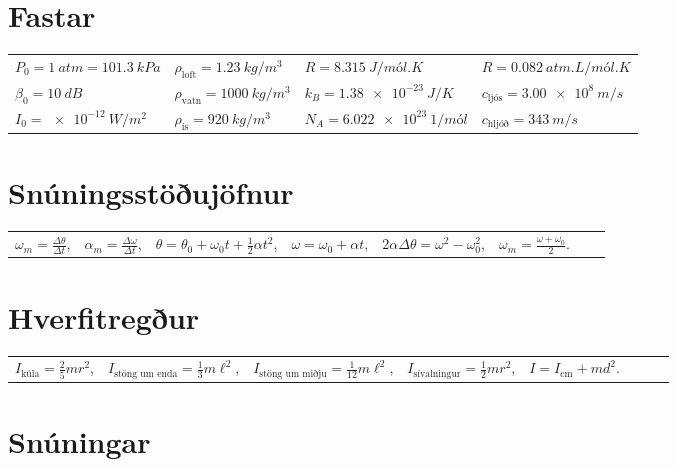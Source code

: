 \section*{Fastar}

\begin{table}[H]
\begin{tabular}{llll}
$P_0 = \SI{1}{atm} = \SI{101.3}{kPa}$ &  $\rho_{\text{loft}} = \SI{1.23}{kg/m^3}$  & $R = \SI{8.315}{J/mól.K}$  
& $R = \SI{0.082}{atm.L/mól.K}$  \\
$\beta_0 = \SI{10}{dB}$ & $\rho_{\text{vatn}} = \SI{1000}{kg/m^3}$ & $k_B = \SI{1.38e-23}{J/K}$ &
$c_{\text{ljós}} = \SI{3.00e8}{m/s}$ \\
 $I_0 = \SI{e-12}{W/m^2}$ &
 $\rho_{\text{ís}} = \SI{920}{kg/m^3}$ & $N_A = \SI{6.022e23}{1/mól}$ & $c_{\text{hljóð}} = \SI{343}{m/s}$
\end{tabular}
\end{table}


\section*{Snúningsstöðujöfnur}

\begin{table}[H]
\begin{tabular}{llllllll}
$\omega_m = \frac{\Delta \theta}{\Delta t}$, & $\alpha_m = \frac{\Delta \omega}{\Delta t}$, & $\theta = \theta_0 + \omega_0 t + \frac{1}{2}\alpha t^2$, & $\omega = \omega_0 + \alpha t$, & $2 \alpha \Delta \theta = \omega^2 - \omega_0^2$, & $\omega_m = \frac{\omega + \omega_0}{2}$.
\end{tabular}
\end{table}

\section*{Hverfitregður}

\begin{table}[H]
\begin{tabular}{llllllll} $I_{\text{kúla}} = \frac{2}{5}mr^2$, & $I_{\text{stöng um enda}} = \frac{1}{3}m\ell^2$, & $I_{\text{stöng um miðju}} = \frac{1}{12}m\ell^2$, & $I_{\text{sívalningur}} = \frac{1}{2}mr^2$, & $I = I_{\text{cm}} + md^2$.
\end{tabular}
\end{table}


\section*{Snúningar}

